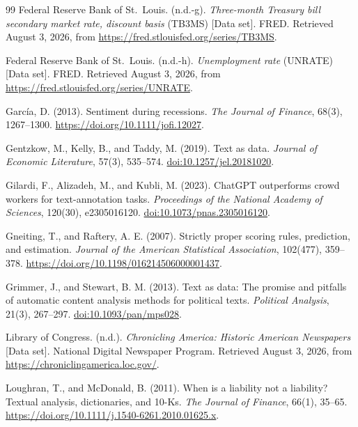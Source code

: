 \begin{thebibliography}{99}
Federal Reserve Bank of St.\ Louis. (n.d.-g). \textit{Three-month Treasury bill secondary market rate, discount basis} (TB3MS) [Data set]. FRED. Retrieved August 3, 2026, from
\url{https://fred.stlouisfed.org/series/TB3MS}.

Federal Reserve Bank of St.\ Louis. (n.d.-h). \textit{Unemployment rate} (UNRATE) [Data set]. FRED. Retrieved August 3, 2026, from
\url{https://fred.stlouisfed.org/series/UNRATE}.

Garc\'{i}a, D. (2013). Sentiment during recessions. \textit{The Journal of Finance}, 68(3), 1267--1300.
\url{https://doi.org/10.1111/jofi.12027}.

Gentzkow, M., Kelly, B., and Taddy, M. (2019).
Text as data. \textit{Journal of Economic Literature}, 57(3), 535--574.
\href{https://doi.org/10.1257/jel.20181020}{doi:10.1257/jel.20181020}.

Gilardi, F., Alizadeh, M., and Kubli, M. (2023).
ChatGPT outperforms crowd workers for text-annotation tasks.
\textit{Proceedings of the National Academy of Sciences}, 120(30), e2305016120.
\href{https://doi.org/10.1073/pnas.2305016120}{doi:10.1073/pnas.2305016120}.

Gneiting, T., and Raftery, A. E. (2007). Strictly proper scoring rules, prediction, and estimation. \textit{Journal of the American Statistical Association}, 102(477), 359--378.
\url{https://doi.org/10.1198/016214506000001437}.

Grimmer, J., and Stewart, B. M. (2013).
Text as data: The promise and pitfalls of automatic content analysis methods for political texts.
\textit{Political Analysis}, 21(3), 267--297.
\href{https://doi.org/10.1093/pan/mps028}{doi:10.1093/pan/mps028}.

Library of Congress. (n.d.). \textit{Chronicling America: Historic American Newspapers} [Data set]. National Digital Newspaper Program. Retrieved August 3, 2026, from
\url{https://chroniclingamerica.loc.gov/}.

Loughran, T., and McDonald, B. (2011). When is a liability not a liability? Textual analysis, dictionaries, and 10-Ks. \textit{The Journal of Finance}, 66(1), 35--65.
\url{https://doi.org/10.1111/j.1540-6261.2010.01625.x}.


\end{thebibliography}

